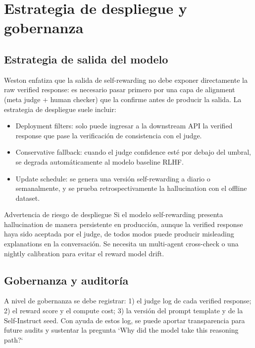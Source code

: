 \section{Estrategia de despliegue y gobernanza}
\subsection{Estrategia de salida del modelo}
Weston enfatiza que la salida de self-rewarding no debe exponer directamente la raw verified response: es necesario pasar primero por una capa de alignment (meta judge + human checker) que la confirme antes de producir la salida. La estrategia de despliegue suele incluir:
\begin{itemize}
    \item Deployment filters: solo puede ingresar a la downstream API la verified response que pase la verificación de consistencia con el judge.
    \item Conservative fallback: cuando el judge confidence esté por debajo del umbral, se degrada automáticamente al modelo baseline RLHF.
    \item Update schedule: se genera una versión self-rewarding a diario o semanalmente, y se prueba retrospectivamente la hallucination con el offline dataset.
\end{itemize}

\begin{warningbox}{Advertencia de riesgo de despliegue}
Si el modelo self-rewarding presenta hallucination de manera persistente en producción, aunque la verified response haya sido aceptada por el judge, de todos modos puede producir misleading explanations en la conversación. Se necesita un multi-agent cross-check o una nightly calibration para evitar el reward model drift.
\end{warningbox}

\subsection{Gobernanza y auditoría}
A nivel de gobernanza se debe registrar: 1) el judge log de cada verified response; 2) el reward score y el compute cost; 3) la versión del prompt template y de la Self-Instruct seed. Con ayuda de estos log, se puede aportar transparencia para future audits y sustentar la pregunta `Why did the model take this reasoning path?`

